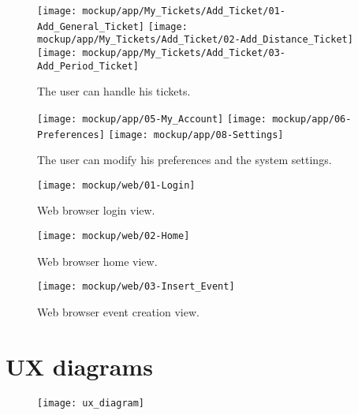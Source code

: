 	\begin{figure}[H]
		\texttt{[image: mockup/app/My\_Tickets/Add\_Ticket/01-Add\_General\_Ticket]}
		\hspace{.3cm}
		\texttt{[image: mockup/app/My\_Tickets/Add\_Ticket/02-Add\_Distance\_Ticket]}
		\hspace{.3cm}
		\texttt{[image: mockup/app/My\_Tickets/Add\_Ticket/03-Add\_Period\_Ticket]}
		\centering 
		\caption{The user can handle his tickets.}
	\end{figure}
	
	\begin{figure}[H]
		\texttt{[image: mockup/app/05-My\_Account]}
		\hspace{.3cm}
		\texttt{[image: mockup/app/06-Preferences]}
		\hspace{.3cm}
		\texttt{[image: mockup/app/08-Settings]}
		\centering 
		\caption{The user can modify his preferences and the system settings.}
	\end{figure}
	
	\begin{figure}[H]
		\texttt{[image: mockup/web/01-Login]}
		\centering
		\caption{Web browser login view.}
	\end{figure}
	\begin{figure}[H]
		\texttt{[image: mockup/web/02-Home]}
		\centering
		\caption{Web browser home view.}
	\end{figure}
	\begin{figure}[H]
		\texttt{[image: mockup/web/03-Insert\_Event]}
		\centering
		\caption{Web browser event creation view.}
	\end{figure}

\section{UX diagrams}
\label{subsect:UX diagrams}
	\begin{figure}
		\vspace*{-30pt}
		\texttt{[image: ux\_diagram]}
		\centering
	\end{figure}